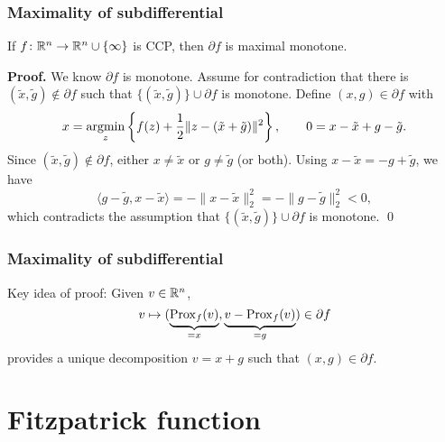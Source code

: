 \documentclass[10pt,mathserif]{beamer}
\begin{document}
\begin{frame}
\frametitle{Maximality of subdifferential}
\setcounter{theorem}{6}
\begin{theorem}
\label{thm:subdiff-maximal}
If $f\colon\mathbb{R}^n\rightarrow \mathbb{R}^n\cup\{\infty\}$ is CCP, then $\partial f$ is maximal monotone.
\end{theorem}
\textbf{Proof.}
We know  $\partial f$ is monotone.
Assume for contradiction that there is 
$(\tilde{x},\tilde{g})\notin \partial f$
such that
$\{(\tilde{x},\tilde{g})\}\cup \partial f$ is
monotone.
Define $(x,g)\in \partial f$ with
\[
x=\operatorname*{argmin}_z\left\{f(z)+\frac{1}{2}\|z-(\tilde x+\tilde g)\|^2\right\},
\qquad
0= x-\tilde x+g-\tilde g.
\]
Since $(\tilde x,\tilde g)\notin \partial f$, either
$x\ne \tilde x$ or $g\ne \tilde g$ (or both).
Using $x-\tilde{x}=-g+\tilde{g}$, we have
\[
\langle g-\tilde g,x-\tilde x\rangle=-\|x-\tilde x\|^2_2=-\|g-\tilde g\|^2_2
<0,
\]
which contradicts the assumption that
$\{(\tilde{x},\tilde{g})\}\cup \partial f$ is
monotone.
\qed
\end{frame}


\begin{frame}
\frametitle{Maximality of subdifferential}
Key idea of proof:
Given $v\in \mathbb{R}^n$,
\[
v\mapsto (\underbrace{\mathrm{Prox}_f(v)}_{=x},\underbrace{v-\mathrm{Prox}_f(v)}_{=g})\in \partial f
\]
provides a unique decomposition $v=x+g$ such that $(x,g)\in \partial f$.
\end{frame}






\section{Fitzpatrick function}
\end{document}
